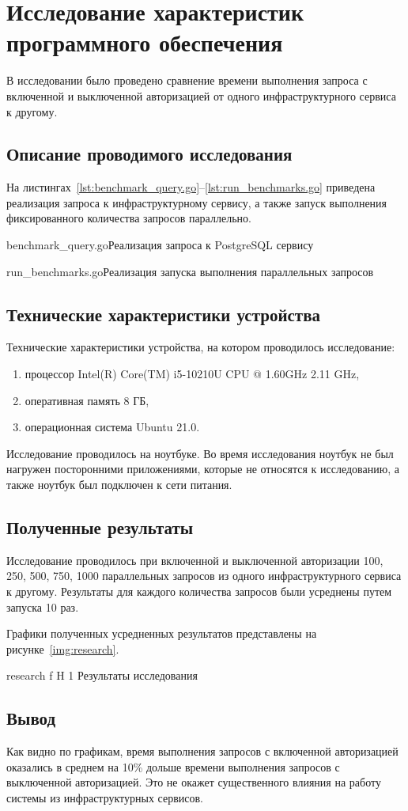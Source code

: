 \chapter{Исследование характеристик программного обеспечения}

В исследовании было проведено сравнение времени выполнения запроса с включенной и выключенной авторизацией от одного инфраструктурного сервиса к другому.

\section{Описание проводимого исследования}
На листингах~\ref{lst:benchmark_query.go}--\ref{lst:run_benchmarks.go} приведена реализация запроса к инфраструктурному сервису, а также запуск выполнения фиксированного количества запросов параллельно.

	{benchmark_query.go}{Реализация запроса к PostgreSQL сервису}
	
	{run_benchmarks.go}{Реализация запуска выполнения параллельных запросов}

\section{Технические характеристики устройства}

Технические характеристики устройства, на котором проводилось исследование:
\begin{enumerate}
\item процессор Intel(R) Core(TM) i5-10210U CPU @ 1.60GHz 2.11 GHz,
\item оперативная память 8 ГБ,
\item операционная система Ubuntu 21.0.
\end{enumerate}

Исследование проводилось на ноутбуке. Во время исследования ноутбук не был нагружен посторонними приложениями, которые не относятся к исследованию, а также ноутбук был подключен к сети питания.

\section{Полученные результаты}
Исследование проводилось при включенной и выключенной авторизации 100, 250, 500, 750, 1000 параллельных запросов из одного инфраструктурного сервиса к другому. Результаты для каждого количества запросов были усреднены путем запуска 10 раз.

Графики полученных усредненных результатов представлены на рисунке~\ref{img:research}.

    {research}
    {f}
    {H}
    {1\textwidth}
    {Результаты исследования}

\section*{Вывод}
Как видно по графикам, время выполнения запросов с включенной авторизацией оказались в среднем на 10\% дольше времени выполнения запросов с выключенной авторизацией. Это не окажет существенного влияния на работу системы из инфраструктурных сервисов.